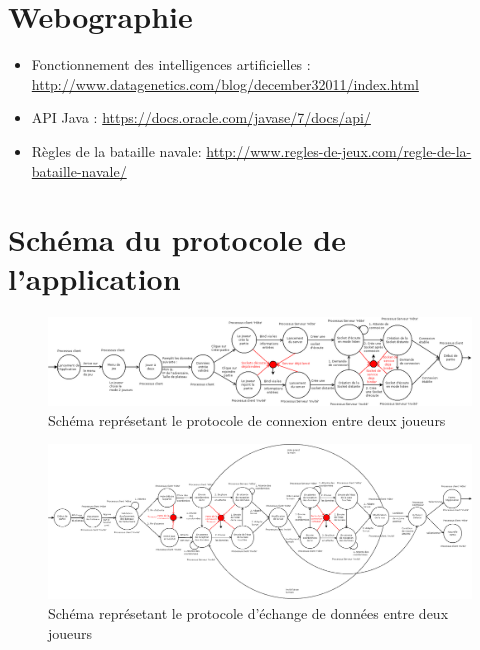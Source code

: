 \begin{appendices}
\begin{itemize}
   
\end{itemize}


\newpage
\section{Webographie}
\begin{itemize}
	\item Fonctionnement des intelligences artificielles : \url{http://www.datagenetics.com/blog/december32011/index.html}
\newline	
	\item API Java : \url{https://docs.oracle.com/javase/7/docs/api/}
	\newline
	\item Règles de la bataille navale: \url{http://www.regles-de-jeux.com/regle-de-la-bataille-navale/}
\end{itemize}

\newpage
\section{Schéma du protocole de l'application}
\begin{figure}
    \centering
    \includegraphics [width=215mm]{images/connection_between_players.png}
    \caption{Schéma représetant le protocole de connexion entre deux joueurs}
    \label{connection}
\end{figure}
\begin{figure}
    \centering
    \includegraphics [width=215mm]{images/data_exhange_between_players.png}
    \caption{Schéma représetant le protocole d'échange de données entre deux joueurs}
    \label{connection}
\end{figure}

\end{appendices}